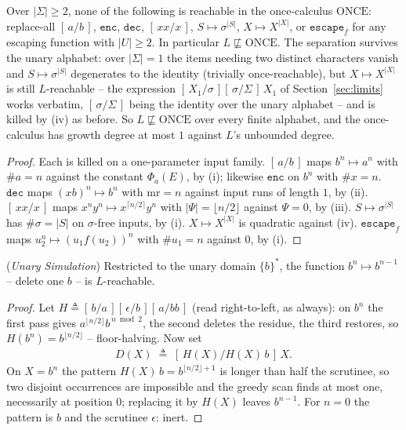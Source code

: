 \documentclass[runningheads,envcountsect]{llncs}
\begin{document}
\begin{corollary}
    \label{cor:once-sep}
    Over $|\Sigma| \geq 2$, none of the following is reachable in the once-calculus $\mathrm{ONCE}$: replace-all $[\,a/b\,]$, $\mathtt{enc}$, $\mathtt{dec}$, $[\,xx/x\,]$, $S \mapsto \sigma^{|S|}$, $X \mapsto X^{|X|}$, or $\mathtt{escape}_f$ for any escaping function with $|U| \geq 2$. In particular $L \not\sqsubseteq \mathrm{ONCE}$. The separation survives the unary alphabet: over $|\Sigma| = 1$ the items needing two distinct characters vanish and $S \mapsto \sigma^{|S|}$ degenerates to the identity (trivially once-reachable), but $X \mapsto X^{|X|}$ is still $L$-reachable -- the expression $[\,X_1/\sigma\,][\,\sigma/\Sigma\,]\,X_1$ of Section~\ref{sec:limits} works verbatim, $[\,\sigma/\Sigma\,]$ being the identity over the unary alphabet -- and is killed by (iv) as before. So $L \not\sqsubseteq \mathrm{ONCE}$ over every finite alphabet, and the once-calculus has growth degree at most $1$ against $L$'s unbounded degree.
\end{corollary}

\begin{proof}
    Each is killed on a one-parameter input family. $[\,a/b\,]$ maps $b^n \mapsto a^n$ with $\#a = n$ against the constant $\Phi_a(E)$, by (i); likewise $\mathtt{enc}$ on $b^n$ with $\#x = n$. $\mathtt{dec}$ maps $(xb)^n \mapsto b^n$ with $\mathrm{mr} = n$ against input runs of length $1$, by (ii). $[\,xx/x\,]$ maps $x^n y^n \mapsto x^{\lceil n/2\rceil}y^n$ with $|\Psi| = \lfloor n/2 \rfloor$ against $\Psi = 0$, by (iii). $S \mapsto \sigma^{|S|}$ has $\#\sigma = |S|$ on $\sigma$-free inputs, by (i). $X \mapsto X^{|X|}$ is quadratic against (iv). $\mathtt{escape}_f$ maps $u_2^n \mapsto (u_1 f(u_2))^n$ with $\#u_1 = n$ against $0$, by (i).
\end{proof}

\begin{proposition}
    (\emph{Unary Simulation})
    \label{prop:unary-once}
    Restricted to the unary domain $\{b\}^*$, the function $b^n \mapsto b^{n-1}$ -- delete one $b$ -- is $L$-reachable.
\end{proposition}

\begin{proof}
    Let $H \triangleq [\,b/a\,][\,\epsilon/b\,][\,a/bb\,]$ (read right-to-left, as always): on $b^n$ the first pass gives $a^{\lfloor n/2\rfloor}b^{\,n \bmod 2}$, the second deletes the residue, the third restores, so $H(b^n) = b^{\lfloor n/2\rfloor}$ -- floor-halving. Now set
    \begin{align}
        D(X) \;\triangleq\; [\,H(X)/H(X)\,b\,]\,X .
    \end{align}
    On $X = b^n$ the pattern $H(X)\,b = b^{\lfloor n/2\rfloor+1}$ is longer than half the scrutinee, so two disjoint occurrences are impossible and the greedy scan finds at most one, necessarily at position $0$; replacing it by $H(X)$ leaves $b^{n-1}$. For $n = 0$ the pattern is $b$ and the scrutinee $\epsilon$: inert.
\end{proof}
\end{document}
